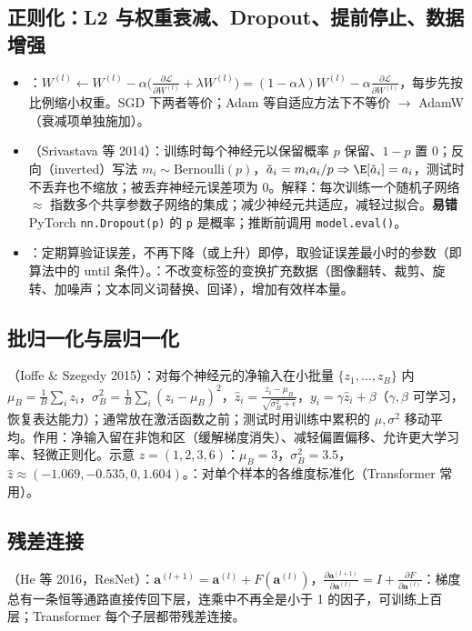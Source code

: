 \subsection{正则化：L2 与权重衰减、Dropout、提前停止、数据增强}
\begin{itemize}
\item {}：$W^{(l)}\leftarrow W^{(l)}-\alpha\big(\frac{\partial\mathcal L}{\partial W^{(l)}}+\lambda W^{(l)}\big)=(1-\alpha\lambda)W^{(l)}-\alpha\frac{\partial\mathcal L}{\partial W^{(l)}}$，每步先按比例缩小权重。SGD 下两者等价；Adam 等自适应方法下不等价 $\to$ AdamW（衰减项单独施加）。
\item {}（Srivastava 等 2014）：训练时每个神经元以保留概率 $p$ 保留、$1-p$ 置 0；反向（inverted）写法 $m_i\sim\text{Bernoulli}(p)$，$\tilde a_i=m_ia_i/p\Rightarrow\E[\tilde a_i]=a_i$，测试时不丢弃也不缩放；被丢弃神经元误差项为 0。解释：每次训练一个随机子网络 $\approx$ 指数多个共享参数子网络的集成；减少神经元共适应，减轻过拟合。\textbf{易错} PyTorch \texttt{nn.Dropout(p)} 的 \texttt{p} 是概率；推断前调用 \texttt{model.eval()}。
\item {}：定期算验证误差，不再下降（或上升）即停，取验证误差最小时的参数（即算法中的 until 条件）。：不改变标签的变换扩充数据（图像翻转、裁剪、旋转、加噪声；文本同义词替换、回译），增加有效样本量。
\end{itemize}

\subsection{批归一化与层归一化}
（Ioffe \& Szegedy 2015）：对每个神经元的净输入在小批量 $\{z_1,\dots,z_B\}$ 内 $\mu_B=\frac1B\sum_iz_i$，$\sigma_B^2=\frac1B\sum_i(z_i-\mu_B)^2$，$\hat z_i=\frac{z_i-\mu_B}{\sqrt{\sigma_B^2+\epsilon}}$，$y_i=\gamma\hat z_i+\beta$（$\gamma,\beta$ 可学习，恢复表达能力）；通常放在激活函数之前；测试时用训练中累积的 $\mu,\sigma^2$ 移动平均。作用：净输入留在非饱和区（缓解梯度消失）、减轻偏置偏移、允许更大学习率、轻微正则化。示意 $z=(1,2,3,6)$：$\mu_B=3$，$\sigma_B^2=3.5$，$\hat z\approx(-1.069,-0.535,0,1.604)$。：对单个样本的各维度标准化（Transformer 常用）。

\subsection{残差连接}
（He 等 2016，ResNet）：$\bm a^{(l+1)}=\bm a^{(l)}+F(\bm a^{(l)})$，$\frac{\partial\bm a^{(l+1)}}{\partial\bm a^{(l)}}=I+\frac{\partial F}{\partial\bm a^{(l)}}$：梯度总有一条恒等通路直接传回下层，连乘中不再全是小于 1 的因子，可训练上百层；Transformer 每个子层都带残差连接。

